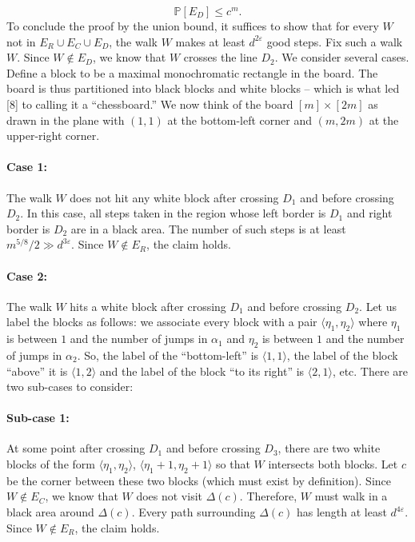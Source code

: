 \documentclass[10pt,a4paper]{article}
\begin{document}
\[\mathbb P[E_D]\leq c^m.\]
To conclude the proof by the union bound, it suffices to show that for every $W$ not in $E_R\cup E_C\cup E_D$, the walk $W$ makes at least $d^{2\varepsilon}$ good steps. Fix such a walk $W$. Since $W\notin E_D$, we know that $W$ crosses the line $D_2$.
We consider several cases. Define a block to be a maximal monochromatic rectangle in the board. The board is thus partitioned into black blocks and white blocks -- which is what led [8] to calling it a ``chessboard.'' We now think of the board $[m]\times[2m]$ as drawn in the plane with $(1,1)$ at the bottom-left corner and $(m,2m)$ at the upper-right corner.
\paragraph{Case 1:} The walk $W$ does not hit any white block after crossing $D_1$ and before crossing $D_2$. In this case, all steps taken in the region whose left border is $D_1$ and right border is $D_2$ are in a black area. The number of such steps is at least $m^{5/8}/2\gg d^{3\varepsilon}$. Since $W\notin E_R$, the claim holds.
\paragraph{Case 2:} The walk $W$ hits a white block after crossing $D_1$ and before crossing $D_2$. Let us label the blocks as follows: we associate every block with a pair $\langle\eta_1,\eta_2\rangle$ where $\eta_1$ is between $1$ and the number of jumps in $\alpha_1$ and $\eta_2$ is between $1$ and the number of jumps in $\alpha_2$. So, the label of the ``bottom-left'' is $\langle1,1\rangle$, the label of the block ``above'' it is $\langle1,2\rangle$ and the label of the block ``to its right'' is $\langle2,1\rangle$, etc. There are two sub-cases to consider:
\paragraph{Sub-case 1:} At some point after crossing $D_1$ and before crossing $D_3$, there are two white blocks of the form $\langle\eta_1,\eta_2\rangle$, $\langle\eta_1+1,\eta_2+1\rangle$ so that $W$ intersects both blocks. Let $c$ be the corner between these two blocks (which must exist by definition). Since $W\notin E_C$, we know that $W$ does not visit $\Delta(c)$. Therefore, $W$ must walk in a black area around $\Delta(c)$. Every path surrounding $\Delta(c)$ has length at least $d^{4\varepsilon}$. Since $W\notin E_R$, the claim holds.
\end{document}
